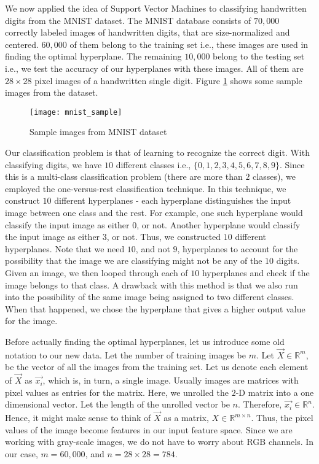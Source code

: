 
We now applied the idea of Support Vector Machines to classifying handwritten digits from the MNIST dataset\cite{mnist}. The MNIST database consists of $70,000$ correctly labeled images of handwritten digits, that are size-normalized and centered. $60,000$ of them belong to the training set i.e., these images are used in finding the optimal hyperplane. The remaining $10,000$ belong to the testing set i.e., we test the accuracy of our hyperplanes with these images. All of them are $28\times28$ pixel images of a handwritten single digit. Figure \ref{fig:mnist} shows some sample images from the dataset.

\begin{figure}[!tb]
	\texttt{[image: mnist\_sample]}
	\centering
	\caption{Sample images from MNIST dataset}
	\label{fig:mnist}
\end{figure}

Our classification problem is that of learning to recognize the correct digit. With classifying digits, we have $10$ different classes i.e., $\{0, 1, 2, 3, 4, 5, 6, 7, 8, 9\}$. Since this is a multi-class classification problem (there are more than $2$ classes), we employed the one-versus-rest classification technique. In this technique, we construct $10$ different hyperplanes - each hyperplane distinguishes the input image between one class and the rest. For example, one such hyperplane would classify the input image as either $0$, or not. Another hyperplane would classify the input image as either $3$, or not. Thus, we constructed $10$ different hyperplanes. Note that we need $10$, and not $9$, hyperplanes to account for the possibility that the image we are classifying might not be any of the $10$ digits. Given an image, we then looped through each of $10$ hyperplanes and check if the image belongs to that class. A drawback with this method is that we also run into the possibility of the same image being assigned to two different classes. When that happened, we chose the hyperplane that gives a higher output value for the image.

Before actually finding the optimal hyperplanes, let us introduce some old notation to our new data. Let the number of training images be $m$. Let $\vec{X}\in\mathbb{R}^{m}$, be the vector of all the images from the training set. Let us denote each element of $\vec{X}$ as $\vec{x_i}$, which is, in turn, a single image. Usually images are matrices with pixel values as entries for the matrix. Here, we unrolled the $2$-D matrix into a one dimensional vector. Let the length of the unrolled vector be $n$. Therefore, $\vec{x_i}\in\mathbb{R}^{n}$. Hence, it might make sense to think of $\vec{X}$ as a matrix, $X\in\mathbb{R}^{m \times n}$. Thus, the pixel values of the image become features in our input feature space. Since we are working with gray-scale images, we do not have to worry about RGB channels. In our case, $m = 60,000$, and $n = 28\times28 = 784$.

